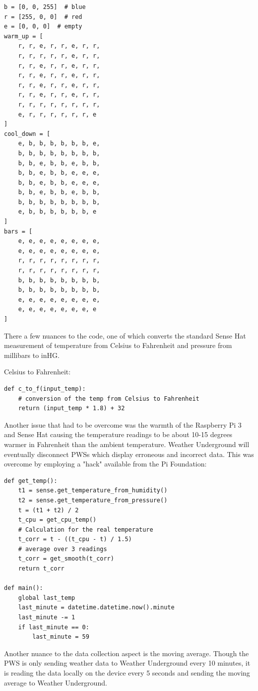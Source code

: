 \documentclass[sigconf]{acmart}
\begin{document}
\begin{verbatim}
b = [0, 0, 255]  # blue
r = [255, 0, 0]  # red
e = [0, 0, 0]  # empty
warm_up = [
    r, r, e, r, r, e, r, r,
    r, r, r, r, r, e, r, r,
    r, r, e, r, r, e, r, r,
    r, r, e, r, r, e, r, r,
    r, r, e, r, r, e, r, r,
    r, r, e, r, r, e, r, r,
    r, r, r, r, r, r, r, r,
    e, r, r, r, r, r, r, e
]
cool_down = [
    e, b, b, b, b, b, b, e,
    b, b, b, b, b, b, b, b,
    b, b, e, b, b, e, b, b,
    b, b, e, b, b, e, e, e,
    b, b, e, b, b, e, e, e,
    b, b, e, b, b, e, b, b,
    b, b, b, b, b, b, b, b,
    e, b, b, b, b, b, b, e
]
bars = [
    e, e, e, e, e, e, e, e,
    e, e, e, e, e, e, e, e,
    r, r, r, r, r, r, r, r,
    r, r, r, r, r, r, r, r,
    b, b, b, b, b, b, b, b,
    b, b, b, b, b, b, b, b,
    e, e, e, e, e, e, e, e,
    e, e, e, e, e, e, e, e
]
\end{verbatim}


There a few nuances to the code, one of which converts the standard Sense Hat measurement of temperature from Celsius to Fahrenheit and pressure from millibars to inHG. 

Celsius to Fahrenheit:

\begin{verbatim}
def c_to_f(input_temp):
    # conversion of the temp from Celsius to Fahrenheit
    return (input_temp * 1.8) + 32
\end{verbatim}


Another issue that had to be overcome was the warmth of the Raspberry Pi 3 and Sense Hat causing the temperature readings to be about 10-15 degrees warmer in Fahrenheit than the ambient temperature. Weather Underground will eventually disconnect PWSs which display erroneous and incorrect data. This was overcome by employing a "hack" available from the Pi Foundation\cite{PiFoundationHack2017}:

\begin{verbatim}
def get_temp():
    t1 = sense.get_temperature_from_humidity()
    t2 = sense.get_temperature_from_pressure()
    t = (t1 + t2) / 2
    t_cpu = get_cpu_temp()
    # Calculation for the real temperature 
    t_corr = t - ((t_cpu - t) / 1.5)
    # average over 3 readings
    t_corr = get_smooth(t_corr)
    return t_corr

def main():
    global last_temp
    last_minute = datetime.datetime.now().minute
    last_minute -= 1
    if last_minute == 0:
        last_minute = 59
\end{verbatim}


Another nuance to the data collection aspect is the moving average. Though the PWS is only sending weather data to Weather Underground every 10 minutes, it is reading the data locally on the device every 5 seconds and sending the moving average to Weather Underground. 
\end{document}
